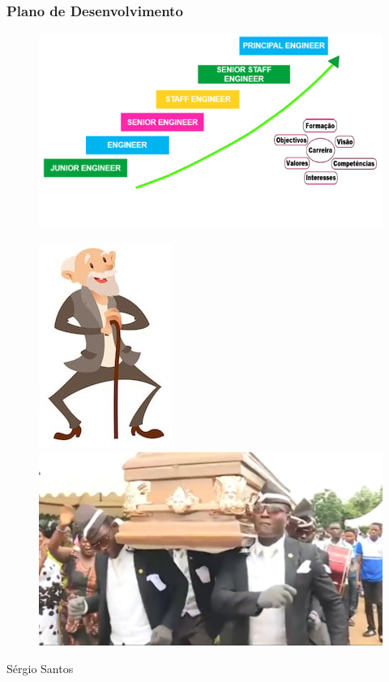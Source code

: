 \begin{frame}
\frametitle{Plano de Desenvolvimento}
\begin{minipage}{.5\linewidth}
\begin{figure}[ht]
\begin{flushleft}
\includegraphics[scale=0.35]{./image/Career_Path/Progressao.png}
\end{flushleft}
\end{figure}
\end{minipage}
\begin{minipage}{.45\linewidth}
\begin{figure}[ht]
	\begin{flushleft}
		\includegraphics[scale=0.25]{./image/Career_Path/Old_Age.jpeg}
	\end{flushleft}\vfill
	\begin{flushright}
		\includegraphics[scale=0.1]{./image/Career_Path/Burial.jpeg}
	\end{flushright}
\end{figure}
\end{minipage}
\vfill
\hfill {\tiny Sérgio Santos}
\end{frame}
